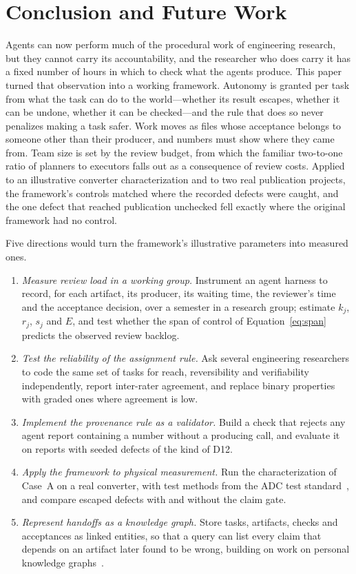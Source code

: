 \section{Conclusion and Future Work}
\label{sec:conclusion}

Agents can now perform much of the procedural work of engineering research, but they
cannot carry its accountability, and the researcher who does carry it has a fixed number
of hours in which to check what the agents produce. This paper turned that observation
into a working framework. Autonomy is granted per task from what the task can do to the
world---whether its result escapes, whether it can be undone, whether it can be
checked---and the rule that does so never penalizes making a task safer. Work moves as
files whose acceptance belongs to someone other than their producer, and numbers must
show where they came from. Team size is set by the review budget, from which the
familiar two-to-one ratio of planners to executors falls out as a consequence of review
costs. Applied to an illustrative converter characterization and to two real
publication projects, the framework's controls matched where the recorded defects were caught,
and the one defect that reached publication unchecked fell exactly where the original
framework had no control.

Five directions would turn the framework's illustrative parameters into measured ones.
\begin{enumerate}[leftmargin=*]
  \item \textit{Measure review load in a working group.} Instrument an agent harness to
    record, for each artifact, its producer, its waiting time, the reviewer's time and the
    acceptance decision, over a semester in a research group; estimate $k_j$, $r_j$, $s_j$
    and $E$, and test whether the span of control of Equation~\eqref{eq:span} predicts the
    observed review backlog.
  \item \textit{Test the reliability of the assignment rule.} Ask several engineering
    researchers to code the same set of tasks for reach, reversibility and verifiability
    independently, report inter-rater agreement, and replace binary properties with graded
    ones where agreement is low.
  \item \textit{Implement the provenance rule as a validator.} Build a check that rejects
    any agent report containing a number without a producing call, and evaluate it on
    reports with seeded defects of the kind of D12.
  \item \textit{Apply the framework to physical measurement.} Run the characterization of
    Case~A on a real converter, with test methods from the ADC test
    standard~\cite{ieee1241}, and compare escaped defects with and without the claim gate.
  \item \textit{Represent handoffs as a knowledge graph.} Store tasks, artifacts, checks
    and acceptances as linked entities, so that a query can list every claim that depends
    on an artifact later found to be wrong, building on work on personal knowledge
    graphs~\cite{mccreary2023pkg}.
\end{enumerate}

